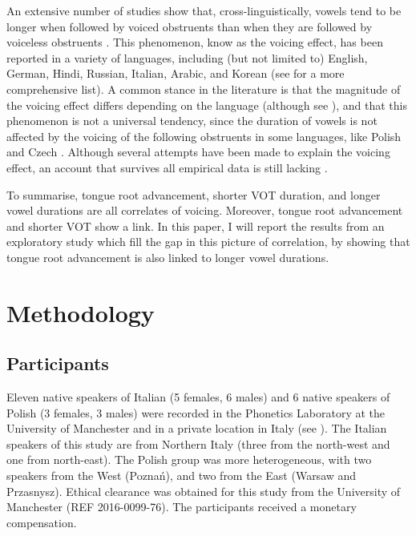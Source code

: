 \documentclass[]{JASAnew}
\begin{document}
An extensive number of studies show that, cross-linguistically, vowels
tend to be longer when followed by voiced obstruents than when they are
followed by voiceless obstruents
\citep{house1953, peterson1960, chen1970, klatt1973, lisker1974, farnetani1986, fowler1992, hussein1994, esposito2002, lampp2004, durvasula2012}.
This phenomenon, know as the voicing effect, has been reported in a
variety of languages, including (but not limited to) English, German,
Hindi, Russian, Italian, Arabic, and Korean (see \citealt{maddieson1976}
for a more comprehensive list). A common stance in the literature is
that the magnitude of the voicing effect differs depending on the
language (although see \citealt{laeufer1992} ), and that this phenomenon
is not a universal tendency, since the duration of vowels is not
affected by the voicing of the following obstruents in some languages,
like Polish and Czech \citep{keating1984}. Although several attempts
have been made to explain the voicing effect, an account that survives
all empirical data is still lacking \citep{durvasula2012,soskuthy2013}.

To summarise, tongue root advancement, shorter VOT duration, and longer
vowel durations are all correlates of voicing. Moreover, tongue root
advancement and shorter VOT show a link. In this paper, I will report
the results from an exploratory study which fill the gap in this picture
of correlation, by showing that tongue root advancement is also linked
to longer vowel durations.

\hypertarget{methodology}{%
\section{Methodology}\label{methodology}}

\hypertarget{participants}{%
\subsection{Participants}\label{participants}}

Eleven native speakers of Italian (5 females, 6 males) and 6 native
speakers of Polish (3 females, 3 males) were recorded in the Phonetics
Laboratory at the University of Manchester and in a private location in
Italy (see ). The Italian speakers of this study
are from Northern Italy (three from the north-west and one from
north-east). The Polish group was more heterogeneous, with two speakers
from the West (Poznań), and two from the East (Warsaw and Przasnysz).
Ethical clearance was obtained for this study from the University of
Manchester (REF 2016-0099-76). The participants received a monetary
compensation.
\end{document}
